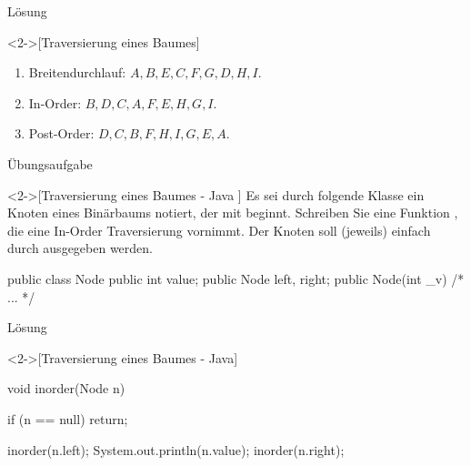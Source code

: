 \begin{frame}[c]{Lösung}
    \begin{solve}<2->[Traversierung eines Baumes]
        \begin{center}
        \end{center}
        \begin{enumerate}[<+(1)->]
            \item Breitendurchlauf: \(A,B,E,C,F,G,D,H,I\).
            \item In-Order: \(B,D,C,A,F,E,H,G,I\).
            \item Post-Order: \(D,C,B,F,H,I,G,E,A\).
        \end{enumerate}
    \end{solve}
\end{frame}

\begin{frame}[fragile,c]{Übungsaufgabe}
    \begin{exercise}<2->[Traversierung eines Baumes - Java ]
        Es sei durch folgende Klasse ein Knoten eines Binärbaums notiert, der mit  beginnt.\pause{} Schreiben Sie eine Funktion , die eine In-Order Traversierung vornimmt.\pause{} Der Knoten soll (jeweils) einfach durch  ausgegeben werden.\pause{}
\begin{plainjava}
public class Node {
    public int value;
    public Node left, right;
    public Node(int _v) {
        /* ... */
    }
}
\end{plainjava}
    \end{exercise}
\end{frame}

\begin{frame}[fragile,c]{Lösung}
    \begin{solve}<2->[Traversierung eines Baumes - Java]
\pause{}\begin{plainjava}
void inorder(Node n)  {
    if (n == null) return;

    inorder(n.left);
    System.out.println(n.value);
    inorder(n.right);
}
\end{plainjava}
    \end{solve}
\end{frame}

